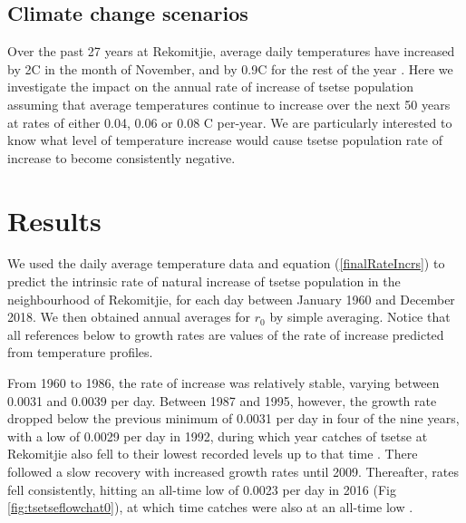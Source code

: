 \documentclass[12pt,a4paper]{article}
\begin{document}
\newpage
\subsection*{Climate change scenarios}

Over the past 27 years at Rekomitjie, average daily temperatures have increased by 2\textdegree C in the month of November, and by 0.9\textdegree C for the rest of the year \cite{Lord2018}.  Here we investigate the impact on the annual rate of increase of tsetse population assuming that average temperatures continue to increase over the next 50 years at rates of either 0.04, 0.06 or 0.08 \textdegree C per-year. We are particularly interested to know what level of temperature increase would cause tsetse population rate of increase to become consistently negative.

\section*{Results}
We used the daily average temperature data and equation (\ref{finalRateIncrs}) to predict the intrinsic rate of natural increase of tsetse population in the neighbourhood of Rekomitjie, for each day between January 1960 and December 2018. We then obtained annual averages for $r_0$ by simple averaging. Notice that all references below to growth rates are values of the rate of increase predicted from temperature profiles.   

From 1960 to 1986, the rate of increase was relatively stable, varying between 0.0031 and 0.0039 per day.  Between 1987 and 1995, however, the growth rate dropped below the previous minimum of 0.0031 per day in four of the nine years, with a low of 0.0029 per day in 1992, during which year catches of tsetse at Rekomitjie also fell to their lowest recorded levels up to that time \cite{hargrove2015mortality}. There followed a slow recovery with increased growth rates until 2009. Thereafter, rates fell consistently, hitting an all-time low of 0.0023 per day in 2016 (Fig \ref{fig:tsetseflowchat0}), at which time catches were also at an all-time low \cite{Lord2018}. 
\end{document}
